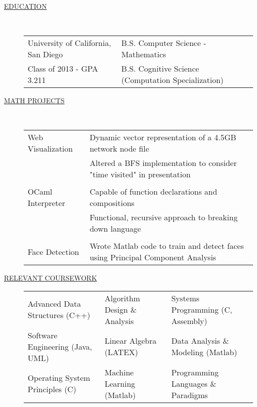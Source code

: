 \documentclass[12pt]{article}
\begin{document}
\begin{description}
        \item[\underline{EDUCATION}]  \hfill \\
            \begin{tabular}{l|l}
                University of California, San Diego & B.S. Computer Science - Mathematics \\
                \hfill Class of 2013 - GPA 3.211    & B.S. Cognitive Science (Computation Specialization)\\
            \end{tabular}


        \item[\underline{MATH PROJECTS}] \hfill \\
            \begin{tabular}{l|l}
                Web Visualization& Dynamic vector representation of a 4.5GB network node file\\
                                 & Altered a BFS implementation to consider "time visited" in presentation\\
                                 \\
                OCaml Interpreter& Capable of function declarations and compositions \\
                                 & Functional, recursive approach to breaking down language \\
                                 \\
                Face Detection   & Wrote Matlab code to train and detect faces using Principal Component Analysis\\

            \end{tabular}

        \iffalse
        \item[\underline{RELEVANT COURSEWORK}]\hfill

            \begin{tabular}{l|l|l}
                Advanced Data Structures (C++)& Algorithm Design \& Analysis & Systems Programming (C, Assembly)\\
             Software Engineering (Java, UML) & Linear Algebra (LATEX) &  Data Analysis \& Modeling (Matlab) \\
                  Operating System Principles (C) & Machine Learning (Matlab) & Programming Languages \& Paradigms\\
            \end{tabular}


\end{description}
\end{document}
